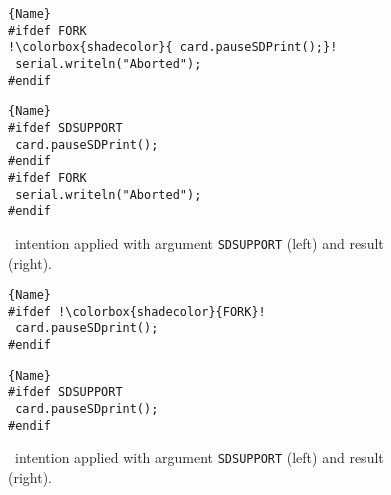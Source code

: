 \begin{figure}[ht]
    \centering
    \begin{minipage}{.40\textwidth}
\begin{lstlisting}[caption=Wrapped code by PC,escapechar=!]{Name}
#ifdef FORK
!\colorbox{shadecolor}{ card.pauseSDPrint();}!
 serial.writeln("Aborted");
#endif
\end{lstlisting}
\end{minipage}\qquad
\begin{minipage}{.40\textwidth}
\begin{lstlisting}[caption=Unwrapped code,escapechar=!]{Name}
#ifdef SDSUPPORT
 card.pauseSDPrint();
#endif
#ifdef FORK
 serial.writeln("Aborted");
#endif
\end{lstlisting}
    \end{minipage}
    \caption{\keepasf~intention applied with argument \texttt{SDSUPPORT} (left) and result (right).}
    \label{fig:keepasfeature}
\end{figure}


\begin{figure}[ht]
    \centering
    \begin{minipage}{.35\textwidth}
\begin{lstlisting}[caption=Wrapped code by PC,escapechar=!]{Name}
#ifdef !\colorbox{shadecolor}{FORK}!
 card.pauseSDprint();
#endif
\end{lstlisting}
\end{minipage}\qquad
\begin{minipage}{.35\textwidth}
\begin{lstlisting}[caption=Unwrapped code,escapechar=!]{Name}
#ifdef SDSUPPORT
 card.pauseSDprint();
#endif
\end{lstlisting}
    \end{minipage}
    \caption{\changepc~intention applied with argument \texttt{SDSUPPORT} (left) and result (right).}
    \label{fig:assignfeature}
\end{figure}